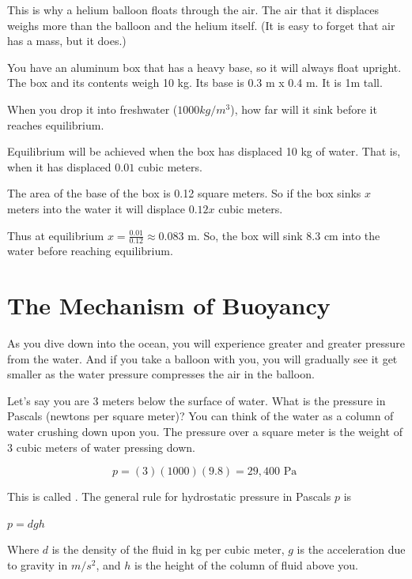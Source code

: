 This is why a helium balloon floats through the air. The air
that it displaces weighs more than the balloon and the helium itself. (It is easy to forget that air has a mass, but it does.)

\begin{Exercise}[title={Buoyancy}, label=buoyancy]
  You have an aluminum box that has a heavy base, so it will always
  float upright. The box and its contents weigh 10 kg. Its base is 0.3 m x 0.4 m. It is 1m tall.

  When you drop it into freshwater ($1000 kg/m^3$), how far will it sink
  before it reaches equilibrium.
  
\end{Exercise}
\begin{Answer}[ref=buoyancy]
  Equilibrium will be achieved when the box has displaced 10 kg of water. That is, when it has displaced $0.01$ cubic meters.

  The area of the base of the box is 0.12 square meters.  So if the
  box sinks $x$ meters into the water it will displace $0.12 x$ cubic
  meters.

  Thus at equilibrium $x = \frac{0.01}{0.12} \approx 0.083$ m.  So,
  the box will sink 8.3 cm into the water before reaching equilibrium.
\end{Answer}

\section{The Mechanism of Buoyancy}

As you dive down into the ocean, you will experience greater and
greater pressure from the water. And if you take a balloon with you, you
will gradually see it get smaller as the water pressure compresses the
air in the balloon.

Let's say you are 3 meters below the surface of water. What is the
pressure in Pascals (newtons per square meter)? You can think of the
water as a column of water crushing down upon you. The pressure over
a square meter is the weight of 3 cubic meters of water pressing down.

$$p = (3)(1000)(9.8) = 29,400 \text{ Pa }$$

This is called . The general rule for
hydrostatic pressure in Pascals $p$ is

$p = d g h$

Where  $d$ is the density of the fluid
in kg per cubic meter, $g$ is the acceleration due to gravity in
$m/s^2$, and $h$ is the height of the column of fluid above you.

